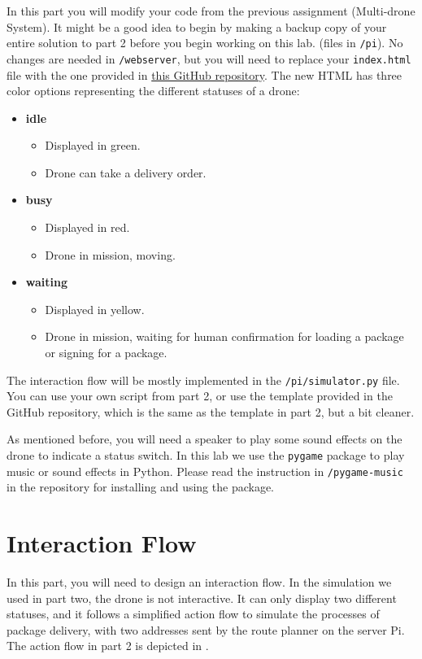 \documentclass{article}
\begin{document}
In this part you will modify your code from the previous assignment (Multi-drone System). It might be a good idea to
begin by making a backup copy of your entire solution to part 2 before you begin working on this lab. (files in \verb!/pi!). No changes are needed in \verb!/webserver!, but you will need to replace your \verb!index.html! file with the one provided in \textcolor{blue}{\href{https://github.com/rogerhenriksson/InfoCom-Drone-6-Interaction_with_Drones}{this GitHub repository}}. The new HTML has three color options representing the different statuses of a drone:
\begin{itemize}
    \item \textbf{idle}
    \begin{itemize}
        \item Displayed in green.
        \item Drone can take a delivery order.
    \end{itemize}
    \item \textbf{busy}
    \begin{itemize}
        \item Displayed in red.
        \item Drone in mission, moving.
    \end{itemize}
    
    \item \textbf{waiting}
    \begin{itemize}
        \item Displayed in yellow.
        \item Drone in mission,  waiting for human confirmation for loading a package or signing for a package.
    \end{itemize}
\end{itemize}
The interaction flow will be mostly implemented in the \verb!/pi/simulator.py! file. You can use your own script from part 2, or use the template provided in the GitHub repository, which is the same as the template in part 2, but a bit cleaner.

As mentioned before, you will need a speaker to play some sound effects on the drone to indicate a status switch. In this lab we use the \verb!pygame! package to play music or sound effects in Python. Please read the instruction in \verb!/pygame-music! in the repository for installing and using the package.


\section{Interaction Flow}
In this part, you will need to design an interaction flow. In the simulation we used in part two, the drone is not interactive. It can only display two different statuses, and it follows a simplified action flow to simulate the processes of package delivery, with two addresses sent by the route planner on the server Pi. The action flow in part 2 is depicted in .
\end{document}
